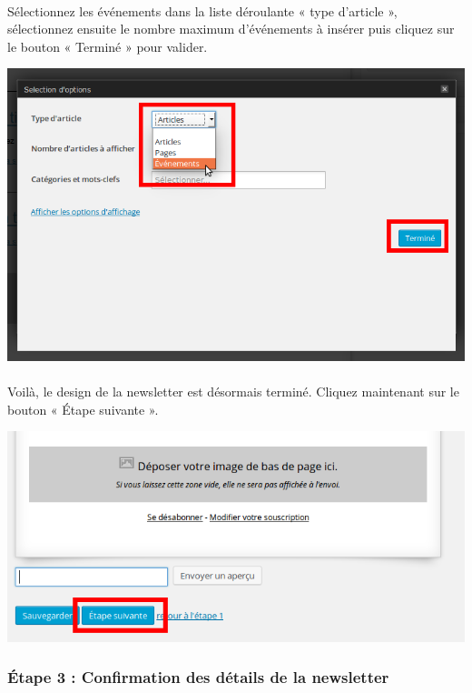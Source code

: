 \documentclass[10pt,a4paper]{article}
\begin{document}
\paragraph{}Sélectionnez les événements dans la liste déroulante « type d'article », sélectionnez ensuite le nombre maximum d'événements à insérer puis cliquez sur le bouton « Terminé » pour valider.
\begin{center}
\includegraphics[scale=0.3]{img/0230.png}
\end{center}
\paragraph{}Voilà, le design de la newsletter est désormais terminé. Cliquez maintenant sur le bouton « Étape suivante ».
\begin{center}
\includegraphics[scale=0.3]{img/0231.png}
\end{center}
\subsubsection{Étape 3 : Confirmation des détails de la newsletter}
\end{document}
